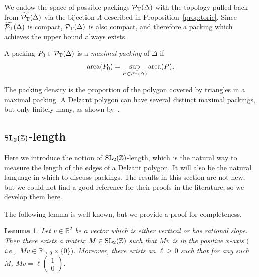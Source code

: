 \documentclass[10pt,a4paper]{amsart}
\numberwithin{equation}{section}
\newtheorem{Lemma}[Theorem]{Lemma}
\def\R{{\mathbb R}}
\def\Z{{\mathbb Z}}
\newcommand{\De}{\Delta}
\newcommand{\area}{\operatorname{area}}
\newcommand{\PT}{\mathcal{P}_{\rm T}}
\newcommand{\PTtilde}{\widetilde{\PT}}
\newcommand{\SL}{{\rm SL}_2(\Z)}
\theoremstyle{definition}
\theoremstyle{plain}
\theoremstyle{plain}
\begin{document}
We endow the space of possible packings $\PT(\De)$ with the topology pulled back from $\PTtilde(\De)$ via the bijection $\Lambda$ described in Proposition~\ref{prop:toric}.
Since $\PTtilde(\De)$ is compact, $\PT(\De)$ is also compact, and therefore
a packing which achieves the upper bound always exists.


\begin{Definition}
A packing $P_0 \in \PT(\De)$ is a \emph{maximal packing} of $\De$ if \[\area(P_0) = \sup_{P \in \PT(\De)} \area(P).\]
\end{Definition}







The packing density is the proportion of the polygon covered by triangles in a maximal packing.
A Delzant polygon can have several distinct maximal packings, but only finitely many, as shown by~\cite[Proposition 1.4]{PeSc2008}.









\subsection[SL2Z-length]{\texorpdfstring{$\boldsymbol{\SL}$}{SL2Z}-length}
Here we introduce the notion of $\SL$-length, which is the natural way to measure the length of the edges of a Delzant polygon.
It will also be the natural language in which to discuss packings.
The results in this section are not new, but we could not find a good reference for their proofs in the literature, so we develop them here.

The following lemma is well known, but we provide a proof for completeness.


\begin{Lemma}\label{lem:SL2Z-vect}
 Let $v\in \R^2$ be a vector which is either vertical or has rational slope. Then there exists a matrix $M\in\SL$ such that $Mv$ is in the positive $x$-axis $($i.e.,~$Mv\in \R_{\geq 0}\times \{0\})$.
 Moreover, there exists an $\ell\geq 0$ such that for any such $M$, $Mv = \ell \left(\begin{smallmatrix}1 \\ 0\end{smallmatrix}\right)$.
\end{Lemma}
\end{document}
